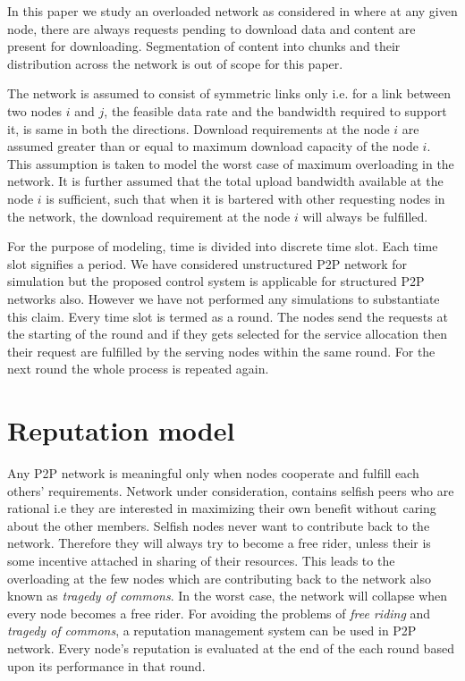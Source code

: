 \documentclass[journal]{IEEEtran}
\begin{document}
In this paper we study an overloaded network as considered in \cite{Satsiou}\cite{RationalMalicious} where at any given node, there are always requests pending to download data and content are present for downloading. Segmentation of content into chunks and their distribution across the network is out of scope for this paper.

The network is assumed to consist of symmetric links only i.e. for a link between two nodes $i$ and $j$, the feasible data rate and the bandwidth required to support it, is same  in both the directions. Download requirements at the node $i$ are assumed greater than or equal to maximum download capacity of the node $i$. This assumption is taken to model the worst case  of maximum overloading in the network. It is further assumed that the total upload bandwidth  available at the node $i$ is sufficient, such that when it is bartered with other requesting nodes in the network, the download requirement at the node $i$ will always be fulfilled. 

For the purpose of modeling, time is divided into discrete time slot. Each time slot signifies a period. We have considered unstructured P2P network for simulation but the proposed control system is applicable for structured P2P networks also. However we have not performed any simulations  to substantiate this claim. Every time slot is termed as a round. The nodes send the requests at the starting of the round and if they gets selected for the service allocation then their request are fulfilled by the serving nodes within the same round. For the next round the whole process is repeated again.  

\section{Reputation model}
\label{Reputation_model}
Any P2P network is meaningful only when nodes cooperate and fulfill each others' requirements. Network under consideration, contains selfish peers who are rational i.e they are interested in maximizing their own benefit without caring about the other members. Selfish nodes never want to contribute back to the network. Therefore they will always try to become a free rider, unless their is some incentive attached in sharing of their resources. This leads to the overloading at the few nodes which are contributing back to the network also known as \emph{tragedy of commons}. In the worst case, the network will collapse  when  every node becomes a free rider. For avoiding the problems of \emph{free riding} and \emph{tragedy of commons}, a reputation management system can be used in P2P network. Every node's reputation is evaluated at the end of the each round based upon its performance in that round. 	
\end{document}
